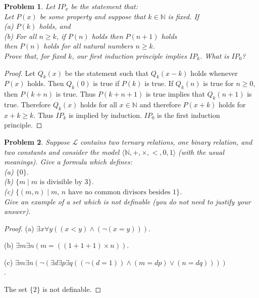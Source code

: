 \documentclass{article}
\newtheorem{problem}{Problem}
\begin{document}
\begin{problem}
Let $IP_x$ be the statement that:\\
\emph{
Let $P(x)$ be some property and suppose that $k \in \mathbb{N}$ is fixed. If\\
(a) $P(k)$ holds, and\\
(b) For all $n \geq k$, if $P(n)$ holds then $P(n+1)$ holds\\
then $P(n)$ holds for all natural numbers $n \geq k$.\\
}
Prove that, for fixed $k$, our first induction principle implies $IP_k$. What is $IP_0$?
\end{problem}
\begin{proof}
Let $Q_k(x)$ be the statement such that $Q_k(x-k)$ holds whenever $P(x)$ holds. Then $Q_k(0)$ is true if $P(k)$ is true. If $Q_k(n)$ is true for $n \geq 0$, then $P(k+n)$ is true. Thus $P(k+n+1)$ is true implies that $Q_k(n+1)$ is true. Therefore $Q_k(x)$ holds for all $x \in \mathbb{N}$ and therefore $P(x+k)$ holds for $x+k \geq k$. Thus $IP_k$ is implied by induction. $IP_0$ is the first induction principle.
\end{proof}

\begin{problem}
Suppose $\mathcal{L}$ contains two ternary relations, one binary relation, and two constants and consider the model $\langle \mathbb{N}, +, \times, <, 0, 1 \rangle$ (with the usual meanings). Give a formula which defines:\\
(a) $\{0\}$.\\
(b) $\{m \mid m \text{ is divisible by } 3\}$.\\
(c) $\{(m,n) \mid \text{$m$, $n$ have no common divisors besides $1$}\}$.\\
Give an example of a set which is not definable (you do not need to justify your answer).
\end{problem}
\begin{proof}
(a) $\exists x \forall y ((x < y) \wedge (\neg (x = y)))$.

(b) $\exists m \exists n (m = ((1 + 1 + 1) \times n))$.

(c) $\exists m \exists n (\neg (\exists d \exists p \exists q ((\neg (d = 1)) \wedge (m = dp) \vee (n = dq))))$\\.

The set $\{2\}$ is not definable.
\end{proof}
\end{document}
